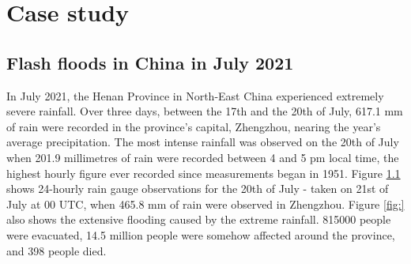 \begin{figure}[htbp]
\label{fig:verif_breakdown_scores_reliability_diagram}
\end{figure}


\section{Case study}
\label{regional_to_global_training_case_study}

\subsection{Flash floods in China in July 2021}

In July 2021, the Henan Province in North-East China experienced extremely severe rainfall. Over three days, between the 17th and the 20th of July, 617.1 mm of rain were recorded in the province's capital, Zhengzhou, nearing the year's average precipitation. The most intense rainfall was observed on the 20th of July when 201.9 millimetres of rain were recorded between 4 and 5 pm local time, the highest hourly figure ever recorded since measurements began in 1951. Figure \ref{} shows 24-hourly rain gauge observations for the 20th of July - taken on 21st of July at 00 UTC, when 465.8 mm of rain were observed in Zhengzhou. Figure \ref{fig:} also shows the extensive flooding caused by the extreme rainfall. 815000 people were evacuated, 14.5 million people were somehow affected around the province, and 398 people died.  

